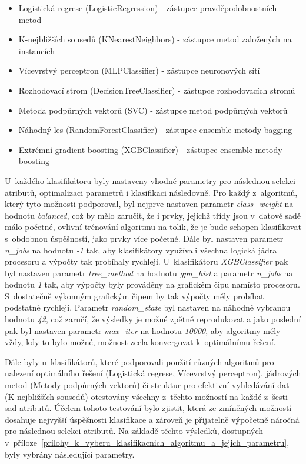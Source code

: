 \begin{itemize}
    \item Logistická regrese (LogisticRegression) - zástupce pravděpodobnostních metod
    \item K-nejbližších sousedů (KNearestNeighbors) - zástupce metod založených na instancích
    \item Vícevrstvý perceptron (MLPClassifier) - zástupce neuronových sítí
    \item Rozhodovací strom (DecisionTreeClassifier) - zástupce rozhodovacích stromů
    \item Metoda podpůrných vektorů (SVC) - zástupce metod podpůrných vektorů
    \item Náhodný les (RandomForestClassifier) - zástupce ensemble metody bagging
    \item Extrémní gradient boosting (XGBClassifier) - zástupce ensemble metody boosting 
\end{itemize}

U~každého klasifikátoru byly nastaveny vhodné parametry pro následnou selekci atributů, optimalizaci parametrů i klasifikaci následovně. Pro každý z~algoritmů, který tyto možnosti podporoval, byl nejprve nastaven parametr \textit{class\_weight} na hodnotu \textit{balanced}, což by mělo zaručit, že i prvky, jejichž třídy jsou v~datové sadě málo početné, ovlivní trénování algoritmu na tolik, že je bude schopen klasifikovat s~obdobnou úspěšností, jako prvky více početné. Dále byl nastaven parametr \textit{n\_jobs} na hodnotu \textit{-1} tak, aby klasifikátory využívali všechna logická jádra procesoru a výpočty tak probíhaly rychleji. U~klasifikátoru \textit{XGBClassifier} pak byl nastaven parametr \textit{tree\_method} na hodnotu \textit{gpu\_hist} a parametr \textit{n\_jobs} na hodnotu \textit{1} tak, aby výpočty byly prováděny na grafickém čipu namísto procesoru. S~dostatečně výkonným grafickým čipem by tak výpočty měly probíhat podstatně rychleji. Parametr \textit{random\_state} byl nastaven na náhodně vybranou hodnotu \textit{42}, což zaručí, že výsledky je možné zpětně reprodukovat a jako poslední pak byl nastaven parametr \textit{max\_iter} na hodnotu \textit{10000}, aby algoritmy měly vždy, kdy to bylo možné, možnost zcela konvergovat k~optimálnímu řešení.

Dále byly u~klasifikátorů, které podporovali použití různých algoritmů pro nalezení optimálního řešení (Logistická regrese, Vícevrstvý perceptron), jádrových metod (Metody podpůrných vektorů) či struktur pro efektivní vyhledávání dat (K-nejbližších sousedů) otestovány všechny z~těchto možností na každé z~šesti sad atributů. Účelem tohoto testování bylo zjistit, která ze zmíněných možností dosahuje nejvyšší úspěšnosti klasifikace a zároveň je přijatelně výpočetně náročná pro následnou selekci atributů. Na základě těchto výsledků, dostupných v~příloze~\ref{prilohy_k_vyberu_klasifikacnich_algoritmu_a_jejich_parametru}, byly vybrány následující parametry.

